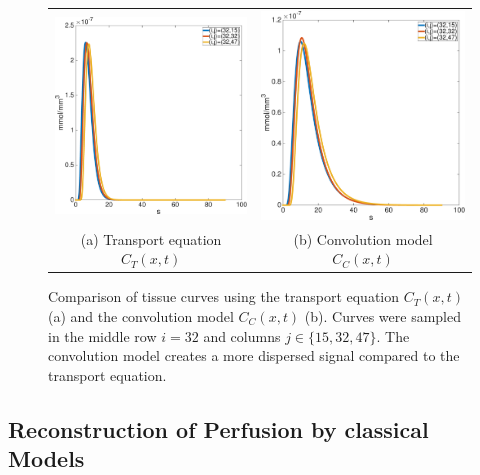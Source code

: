 \documentclass[paper=a4, fontsize=11pt,parskip=half,headings=small]{scrartcl}
\begin{document}
	
	\begin{figure}[H]
		\centering
		\begin{tabular}{c c}
			\includegraphics[width=.45\textwidth]{figs/PMM153247.eps} & \includegraphics[width=.45\textwidth]{figs/convM153247.eps} \\
			(a) Transport equation $C_T(x,t)$ & (b) Convolution model $C_C(x,t)$
		\end{tabular}
		\caption{Comparison of tissue curves using the transport equation $C_T(x,t)$ (a) and the convolution model $C_C(x,t)$ (b). Curves were sampled in the middle row $i=32$ and columns $j \in \{15,32,47\}$. The convolution model creates a more dispersed signal compared to the transport equation.}
		\label{fig:tissuecomp}
	\end{figure}
	
	\subsection{Reconstruction of Perfusion by classical Models}

\end{document}
